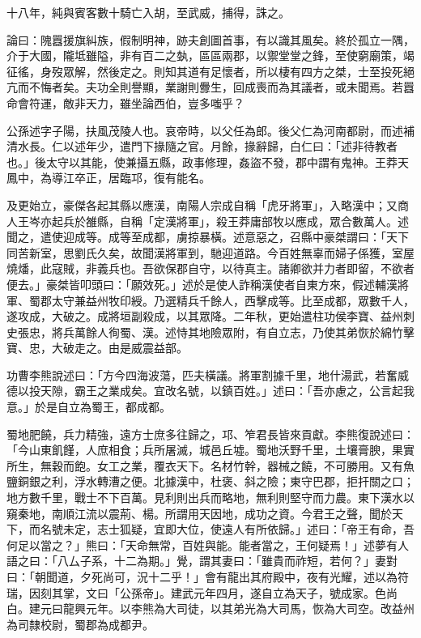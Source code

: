 \begin{pinyinscope}
十八年，純與賓客數十騎亡入胡，至武威，捕得，誅之。

論曰：隗囂援旗糾族，假制明神，跡夫創圖首事，有以識其風矣。終於孤立一隅，介于大國，隴坻雖隘，非有百二之埶，區區兩郡，以禦堂堂之鋒，至使窮廟策，竭征徭，身歿眾解，然後定之。則知其道有足懷者，所以棲有四方之桀，士至投死絕亢而不悔者矣。夫功全則譽顯，業謝則釁生，回成喪而為其議者，或未聞焉。若囂命會符運，敵非天力，雖坐論西伯，豈多嗤乎？

公孫述字子陽，扶風茂陵人也。哀帝時，以父任為郎。後父仁為河南都尉，而述補清水長。仁以述年少，遣門下掾隨之官。月餘，掾辭歸，白仁曰：「述非待教者也。」後太守以其能，使兼攝五縣，政事修理，姦盜不發，郡中謂有鬼神。王莽天鳳中，為導江卒正，居臨邛，復有能名。

及更始立，豪傑各起其縣以應漢，南陽人宗成自稱「虎牙將軍」，入略漢中；又商人王岑亦起兵於雒縣，自稱「定漢將軍」，殺王莽庸部牧以應成，眾合數萬人。述聞之，遣使迎成等。成等至成都，虜掠暴橫。述意惡之，召縣中豪桀謂曰：「天下同苦新室，思劉氏久矣，故聞漢將軍到，馳迎道路。今百姓無辜而婦子係獲，室屋燒燔，此寇賊，非義兵也。吾欲保郡自守，以待真主。諸卿欲并力者即留，不欲者便去。」豪桀皆叩頭曰：「願效死。」述於是使人詐稱漢使者自東方來，假述輔漢將軍、蜀郡太守兼益州牧印綬。乃選精兵千餘人，西擊成等。比至成都，眾數千人，遂攻成，大破之。成將垣副殺成，以其眾降。二年秋，更始遣柱功侯李寶、益州刺史張忠，將兵萬餘人徇蜀、漢。述恃其地險眾附，有自立志，乃使其弟恢於綿竹擊寶、忠，大破走之。由是威震益部。

功曹李熊說述曰：「方今四海波蕩，匹夫橫議。將軍割據千里，地什湯武，若奮威德以投天隙，霸王之業成矣。宜改名號，以鎮百姓。」述曰：「吾亦慮之，公言起我意。」於是自立為蜀王，都成都。

蜀地肥饒，兵力精強，遠方士庶多往歸之，邛、笮君長皆來貢獻。李熊復說述曰：「今山東飢饉，人庶相食；兵所屠滅，城邑丘墟。蜀地沃野千里，土壤膏腴，果實所生，無穀而飽。女工之業，覆衣天下。名材竹幹，器械之饒，不可勝用。又有魚鹽銅銀之利，浮水轉漕之便。北據漢中，杜褒、斜之險；東守巴郡，拒扞關之口；地方數千里，戰士不下百萬。見利則出兵而略地，無利則堅守而力農。東下漢水以窺秦地，南順江流以震荊、楊。所謂用天因地，成功之資。今君王之聲，聞於天下，而名號未定，志士狐疑，宜即大位，使遠人有所依歸。」述曰：「帝王有命，吾何足以當之？」熊曰：「天命無常，百姓與能。能者當之，王何疑焉！」述夢有人語之曰：「八厶子系，十二為期。」覺，謂其妻曰：「雖貴而祚短，若何？」妻對曰：「朝聞道，夕死尚可，況十二乎！」會有龍出其府殿中，夜有光耀，述以為符瑞，因刻其掌，文曰「公孫帝」。建武元年四月，遂自立為天子，號成家。色尚白。建元曰龍興元年。以李熊為大司徒，以其弟光為大司馬，恢為大司空。改益州為司隸校尉，蜀郡為成都尹。


\end{pinyinscope}
